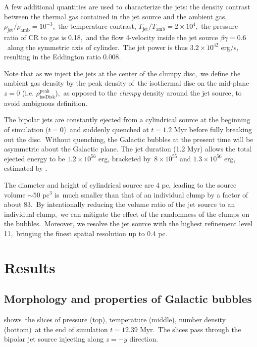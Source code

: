 \documentclass[twocolumn]{aastex631}
\begin{document}
  A few additional quantities are used to characterize the jets:
  the density contrast between the thermal gas contained in the jet source and the ambient gas,\
  $\rho_{\text{jet}}/\rho_{\text{amb}}=10^{-3}$,\
  the temperature contrast, $T_{\text{jet}}/T_{\text{amb}}=2\times10^{4}$,\
  the pressure ratio of CR to gas is 0.18,\
  and the flow 4-velocity inside the jet source $\beta\gamma = 0.6$\
  along the symmetric axis of cylinder.\
  The jet power is thus $3.2\times 10^{42}$ erg/s, resulting in the Eddington ratio 0.008.

  Note that as we inject the jets at the center of the clumpy disc,\
  we define the ambient gas density by the peak density of\
  the isothermal disc on the mid-plane $z=0$ (i.e. $\rho^{\text{peak}}_{\text{isoDisk}}$),\
  as opposed to the \textit{clumpy} density around the jet source, to avoid ambiguous definition.


  The bipolar jets are constantly ejected from a cylindrical source at the beginning of simulation ($t=0$)\
  and suddenly quenched at $t=1.2$ Myr before fully breaking out the disc.\
  Without quenching, the Galactic bubbles at the present time will be asymmetric about the Galactic plane.
  The jet duration (1.2 Myr) allows the total ejected energy to be $1.2\times10^{56}$ erg, bracketed by\
  $8\times10^{55}$ and $1.3\times10^{56}$ erg, estimated by \citet{Predehl2020}.\



  The diameter and height of cylindrical source are 4 pc, leading to the source volume $\sim 50 \text{ pc}^{3}$ is\
  much smaller than that of an individual clump by a factor of about 83.\
  By intentionally reducing the volume ratio of the jet source to an individual clump,\
  we can mitigate the effect of the randomness of the clumps on the bubbles.\
  Moreover, we resolve the jet source with the highest refinement level 11,\
  bringing the finest spatial resolution up to 0.4 pc.\



\section{Results}
\label{Results}

\subsection{Morphology and properties of Galactic bubbles}

  shows\
 the slices of pressure (top), temperature (middle), number density (bottom)\
 at the end of simulation $t=12.39$ Myr.\
 The slices pass through the bipolar jet source injecting along $z=-y$ direction.
\end{document}
